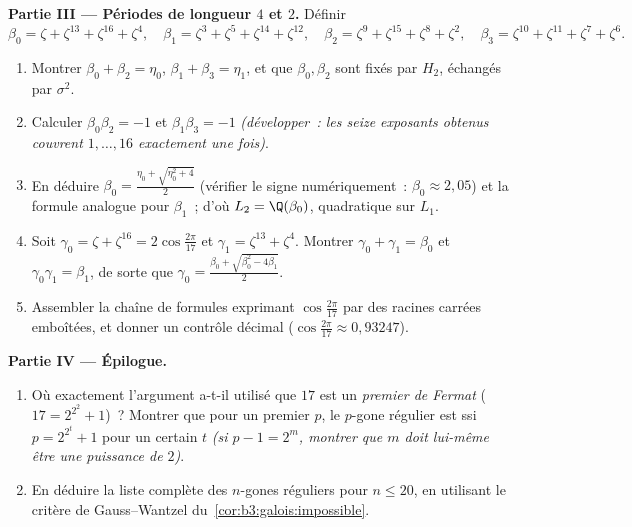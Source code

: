 \begin{problem}
\medskip
\noindent\textbf{Partie III --- Périodes de longueur $4$ et
$2$.}
Définir
\[
\beta_0 = \zeta + \zeta^{13} + \zeta^{16} + \zeta^{4},\quad
\beta_1 = \zeta^3 + \zeta^5 + \zeta^{14} + \zeta^{12},\quad
\beta_2 = \zeta^9 + \zeta^{15} + \zeta^{8} + \zeta^{2},\quad
\beta_3 = \zeta^{10} + \zeta^{11} + \zeta^{7} + \zeta^{6}.
\]
\begin{enumerate}[resume]
  \item Montrer $\beta_0 + \beta_2 = \eta_0$, $\beta_1 +
        \beta_3 = \eta_1$, et que $\beta_0, \beta_2$ sont
        fixés par $H_2$, échangés par $\sigma^2$.
  \item Calculer $\beta_0\beta_2 = -1$ et $\beta_1\beta_3 = -1$
        \emph{(développer~: les seize exposants obtenus
        couvrent $1, \dots, 16$ exactement une fois)}.
  \item En déduire $\beta_0 = \frac{\eta_0 +
        \sqrt{\eta_0^2 + 4}}2$ (vérifier le signe
        numériquement~: $\beta_0 \approx 2{,}05$) et la
        formule analogue pour $\beta_1$~; d'où $L_2 =
        \Q(\beta_0)$, quadratique sur $L_1$.
  \item Soit $\gamma_0 = \zeta + \zeta^{16} =
        2\cos\frac{2\pi}{17}$ et $\gamma_1 = \zeta^{13} +
        \zeta^4$. Montrer $\gamma_0 + \gamma_1 = \beta_0$ et
        $\gamma_0\gamma_1 = \beta_1$, de sorte que $\gamma_0 =
        \frac{\beta_0 + \sqrt{\beta_0^2 - 4\beta_1}}2$.
  \item Assembler la chaîne de formules exprimant
        $\cos\frac{2\pi}{17}$ par des racines carrées
        emboîtées, et donner un contrôle décimal
        ($\cos\frac{2\pi}{17} \approx 0{,}93247$).
\end{enumerate}

\medskip
\noindent\textbf{Partie IV --- Épilogue.}
\begin{enumerate}[resume]
  \item Où exactement l'argument a-t-il utilisé que $17$ est un
        \emph{premier de Fermat} ($17 = 2^{2^2} + 1$)~? Montrer
        que pour un premier $p$, le $p$-gone régulier est
         ssi $p = 2^{2^t} + 1$ pour un certain $t$
        \emph{(si $p - 1 = 2^m$, montrer que $m$ doit
        lui-même être une puissance de $2$)}.
  \item En déduire la liste complète des $n$-gones réguliers
         pour $n \leq 20$, en utilisant le
        critère de Gauss--Wantzel
        du~\cref{cor:b3:galois:impossible}.
\end{enumerate}


\end{problem}
